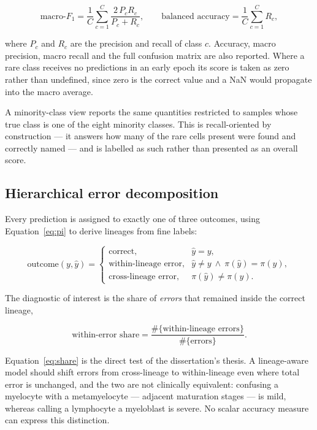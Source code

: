 \documentclass[11pt,a4paper]{article}
\begin{document}
\begin{equation}
  \text{macro-}F_1 = \frac{1}{C}\sum_{c=1}^{C}
    \frac{2\,P_c R_c}{P_c + R_c},
  \qquad
  \text{balanced accuracy} = \frac{1}{C}\sum_{c=1}^{C} R_c,
  \label{eq:macrof1}
\end{equation}

where $P_c$ and $R_c$ are the precision and recall of class $c$. Accuracy, macro
precision, macro recall and the full confusion matrix are also reported. Where a
rare class receives no predictions in an early epoch its score is taken as zero
rather than undefined, since zero is the correct value and a NaN would propagate
into the macro average.

A minority-class view reports the same quantities restricted to samples whose
true class is one of the eight minority classes. This is recall-oriented by
construction --- it answers how many of the rare cells present were found and
correctly named --- and is labelled as such rather than presented as an overall
score.

\subsection{Hierarchical error decomposition}
\label{sec:hierrors}

Every prediction is assigned to exactly one of three outcomes, using
Equation~\eqref{eq:pi} to derive lineages from fine labels:

\begin{equation}
  \text{outcome}(y, \hat{y}) = \begin{cases}
    \text{correct}, & \hat{y} = y,\\
    \text{within-lineage error}, & \hat{y} \ne y \ \wedge\ \pi(\hat{y}) = \pi(y),\\
    \text{cross-lineage error}, & \pi(\hat{y}) \ne \pi(y).
  \end{cases}
  \label{eq:decomp}
\end{equation}

The diagnostic of interest is the share of \emph{errors} that remained inside the
correct lineage,

\begin{equation}
  \text{within-error share} = \frac{\#\{\text{within-lineage errors}\}}{\#\{\text{errors}\}}.
  \label{eq:share}
\end{equation}

Equation~\eqref{eq:share} is the direct test of the dissertation's thesis. A
lineage-aware model should shift errors from cross-lineage to within-lineage even
where total error is unchanged, and the two are not clinically equivalent:
confusing a myelocyte with a metamyelocyte --- adjacent maturation stages --- is
mild, whereas calling a lymphocyte a myeloblast is severe. No scalar accuracy
measure can express this distinction.
\end{document}
